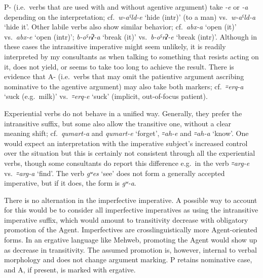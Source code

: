 \documentclass[output=paper]{langsci/langscibook}
\begin{document}

P- (i.e.\ verbs that are used with and without agentive
argument) take \emph{-e} or \emph{-a} depending on the interpretation;
cf.\ \emph{w-aˤld-e} `hide (intr)' (to a man) vs.\ \emph{w-aˤld-a} `hide
it'. Other labile verbs also show similar behavior; cf.\ \emph{abx-a}
`open (it)' vs.\ \emph{abx-e} `open (intr)'; \emph{b-oˤrʡ-a} `break
(it)' vs.\ \emph{b-oˤrʡ-e} `break (intr)'. Although in these cases the
intransitive imperative might seem unlikely, it is readily interpreted
by my consultants as when talking to something that resists acting on it,
does not yield, or seems to take too long to achieve the result. There
is evidence that A- (i.e.\ verbs that may omit the patientive
argument ascribing nominative to the agentive argument) may also take
both markers; cf.\ \emph{꞊erq-a} `suck (e.g.\ milk)' vs.\ \emph{꞊erq-e}
`suck' (implicit, out-of-focus patient).

Experiential verbs do not behave in a unified way. Generally, they
prefer the intransitive suffix, but some also allow the transitive one,
without a clear meaning shift; cf.\ \emph{qumart-a} and \emph{qumart-e}
`forget', \emph{꞊ah-e} and \emph{꞊ah-a} `know'. One would expect an
interpretation with the imperative subject’s
increased control over the situation
but this is certainly not consistent through all the experiential verbs,
though some consultants do report this difference e.g.\ in the verb
\emph{꞊arg-e} vs.\ \mbox{\emph{꞊arg-a}} `find'. The verb \emph{gʷes} `see' does
not form a generally accepted imperative, but if it does, the form is
\emph{gʷ-a}.

There is no alternation in the imperfective imperative. A possible way
to account for this would be to consider all imperfective imperatives as
using the intransitive imperative suffix, which would amount to transitivity
decrease with obligatory promotion of the Agent. Imperfectives are
crosslinguistically more Agent-oriented forms. In an ergative language
like Mehweb, promoting the Agent would show up as decrease in
transitivity. The assumed promotion is, however, internal to verbal
morphology and does not change argument marking. P retains nominative
case, and A, if present, is marked with ergative.
\end{document}
